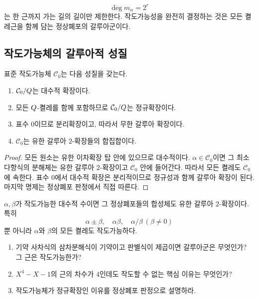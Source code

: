 \begin{keyidea}
\[
  \deg m_\alpha=2^r
\]
는 한 근까지 가는 길의 길이만 제한한다. 작도가능성을 완전히 결정하는 것은 모든 켤레근을 함께 담는 정상폐포의 갈루아군이다.
\end{keyidea}

\subsection{작도가능체의 갈루아적 성질}

\begin{proposition}
표준 작도가능체 $\mathcal C_0$는 다음 성질을 갖는다.
\begin{enumerate}[label=(\roman*)]
  \item $\mathcal C_0/Q$는 대수적 확장이다.
  \item 모든 $Q$-켤레를 함께 포함하므로 $\mathcal C_0/Q$는 정규확장이다.
  \item 표수 $0$이므로 분리확장이고, 따라서 무한 갈루아 확장이다.
  \item $\mathcal C_0$는 유한 갈루아 $2$-확장들의 합집합이다.
\end{enumerate}
\end{proposition}

\begin{proof}
모든 원소는 유한 이차확장 탑 안에 있으므로 대수적이다. $\alpha\in\mathcal C_0$이면 그 최소다항식의 분해체는 유한 갈루아 $2$-확장이고 $\mathcal C_0$ 안에 들어간다. 따라서 모든 켤레도 $\mathcal C_0$에 속한다. 표수 $0$에서 대수적 확장은 분리적이므로 정규성과 함께 갈루아 확장이 된다. 마지막 명제는 정상폐포 판정에서 직접 따른다.
\end{proof}

\begin{corollary}
$\alpha,\beta$가 작도가능한 대수적 수이면 그 정상폐포들의 합성체도 유한 갈루아 $2$-확장이다. 특히
\[
  \alpha\pm\beta,\quad \alpha\beta,\quad \alpha/\beta\ (\beta\ne0)
\]
뿐 아니라 $\alpha$와 $\beta$의 모든 켤레도 작도가능하다.
\end{corollary}

\begin{checkpoint}
\begin{enumerate}[label=(\alph*)]
  \item 기약 사차식의 삼차분해식이 기약이고 판별식이 제곱이면 갈루아군은 무엇인가? 그 근은 작도가능한가?
  \item $X^4-X-1$의 근의 차수가 $4$인데도 작도할 수 없는 핵심 이유는 무엇인가?
  \item 작도가능체가 정규확장인 이유를 정상폐포 판정으로 설명하라.
\end{enumerate}
\end{checkpoint}
